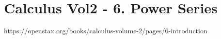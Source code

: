 \section{Calculus Vol2 - 6. Power Series}

\url{https://openstax.org/books/calculus-volume-2/pages/6-introduction}


\clearpage

\clearpage

\clearpage

\clearpage
